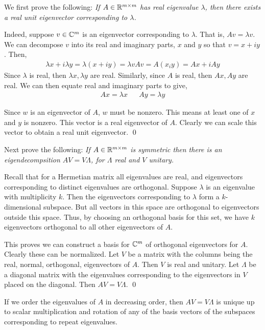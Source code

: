 \documentclass[10pt]{article}
\begin{document}
\begin{solution}[Solution]
We first prove the following: \textit{If \( A\in\mathbb{R}^{m\times m} \) has real eigenvalue \( \lambda \), then there exists a real unit eigenvector corresponding to \( \lambda \).}

Indeed, suppose \( v\in\mathbb{C}^m \) is an eigenvector corresponding to \( \lambda \). That is, \( Av=\lambda v \). We can decompose \( v \) into its real and imaginary parts, \( x \) and \( y \) so that \( v=x+iy \). Then,
\begin{align*}
    \lambda x + i\lambda y = \lambda(x+iy) = \lambda v  Av = A(x_iy) = Ax+iAy
\end{align*}
Since \( \lambda \) is real, then \( \lambda x, \lambda y \) are real. Similarly, since \( A \) is real, then \( Ax, Ay \) are real. We can then equate real and imaginary parts to give, 
\begin{align*}
   Ax = \lambda x && Ay=\lambda y 
\end{align*}

Since \( w \) is an eigenvector of \( A \), \( w \) must be nonzero. This means at least one of \( x \) and \( y \) is nonzero. This vector is a real eigenvector of \( A \). Clearly we can scale this vector to obtain a real unit eigenvector. \qed

Next prove the following: \textit{If \( A\in\mathbb{R}^{m\times m} \) is symmetric then there is an eigendecompsition \( AV=V\Lambda \), for \( \Lambda \) real and \( V \) unitary.}

Recall that for a Hermetian matrix all eigenvalues are real, and eigenvectors corresponding to distinct eigenvalues are orthogonal. Suppose \( \lambda \) is an eigenvalue with multiplicity \( k \). Then the eigenvectors corresponding to \( \lambda  \) form a \( k \)-dimensional subspace. But all vectors in this space are orthogonal to eigenvectors outside this space. Thus, by choosing an orthogonal basis for this set, we have \( k \) eigenvectors orthogonal to all other eigenvectors of \( A \).

This proves we can construct a basis for \( \mathbb{C}^{m} \) of orthogonal eigenvectors for \( A \). Clearly these can be normalized. Let \( V \) be a matrix with the columns being the real, normal, orthogonal, eigenvectors of \( A \). Then \( V \) is real and unitary. Let \( \Lambda \) be a diagonal matrix with the eigenvalues corresponding to the eigenvectors in \( V \) placed on the diagonal. Then \( AV = V\Lambda \). \qed

If we order the eigenvalues of \( A \) in decreasing order, then \( AV=V\Lambda \) is unique up to scalar multiplication and rotation of any of the basis vectors of the subspaces corresponding to repeat eigenvalues.


\end{solution}
\end{document}
